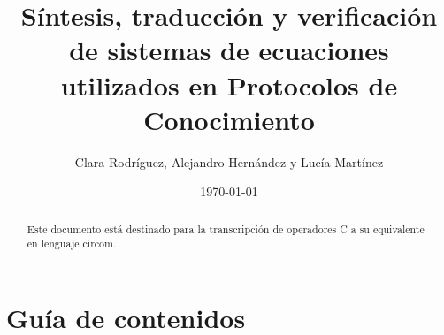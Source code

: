 \documentclass[a4paper,10pt]{article}
\begin{document}
	\title{Síntesis, traducción y verificación de sistemas de ecuaciones utilizados en Protocolos de Conocimiento}
	\author{Clara Rodríguez, Alejandro Hernández y Lucía Martínez}
	\date{\today}  
	\maketitle 
	
	\begin{abstract}
		\begin{center}
			Este documento está destinado para la transcripción de operadores C a su equivalente en lenguaje circom.
			
		\end{center}
	\end{abstract}
	
	\section*{Guía de contenidos}
	
\end{document}
